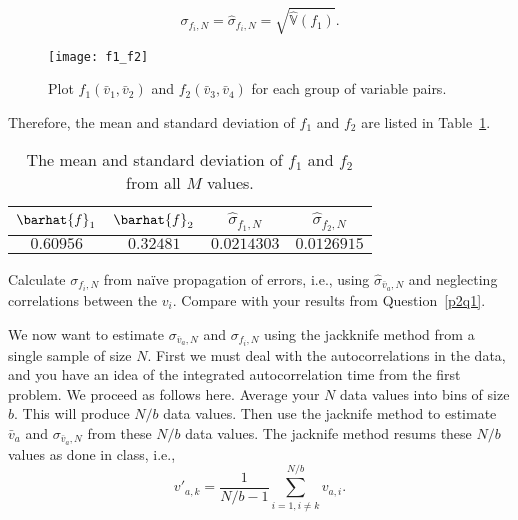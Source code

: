 \begin{equation}
    \sigma_{f_i,N} = \hat{\sigma}_{f_i,N} = \sqrt{\hat{\mathbb{V}}(f_1)}.
\end{equation}

\begin{figure}
    \centering
    \texttt{[image: f1\_f2]}
    \caption{Plot \(f_1(\bar{v}_1, \bar{v}_2)\) and \(f_2(\bar{v}_3, \bar{v}_4)\) for each group of variable pairs.}
    \label{fig:fi}
\end{figure}

Therefore, the mean and standard deviation of \(f_1\) and
\(f_2\) are listed in Table~\ref{tab:stdf1f2}.

\begin{table}
    \centering
    \caption{The mean and standard deviation of \(f_1\) and \(f_2\) from all \(M\) values.}
    \label{tab:stdf1f2}
    \begin{tabular}{@{}cccc@{}}
        \toprule
        \(\barhat{f}_1\) & \(\barhat{f}_2\) & \(\hat{\sigma}_{f_1,N}\) & \(\hat{\sigma}_{f_2,N}\) \\
        \midrule
        \(0.60956\)      & \(0.32481\)      & \(0.0214303\)            & \(0.0126915\)            \\
        \bottomrule
    \end{tabular}
\end{table}


\Question{} Calculate \(\sigma_{f_i,N}\) from naïve propagation of errors, i.e., using
\(\hat{\sigma}_{\bar{v}_a,N}\) and neglecting correlations between the \(v_i\). Compare with
your results from Question~\ref{p2q1}.

\Answer{}



\Question{} We now want to estimate \(\sigma_{\bar{v}_a,N}\) and \(\sigma_{f_i,N}\) using
the jackknife method from a single sample of size \(N\).
First we must deal with the autocorrelations in the data, and you have an idea of the
integrated autocorrelation time from the first problem. We proceed as follows here. Average
your \(N\) data values into bins of size \(b\). This will produce \(N/b\) data values.
Then use the jacknife method to estimate \(\bar{v}_a\) and \(\sigma_{\bar{v}_a,N}\) from
these \(N/b\) data values. The jacknife method resums these \(N/b\) values as done in class,
i.e.,
%
\begin{equation}
    v'_{a,k} = \frac{ 1 }{ N / b - 1 } \sum_{i=1, i \neq k}^{N/b} v_{a,i}.
\end{equation}


